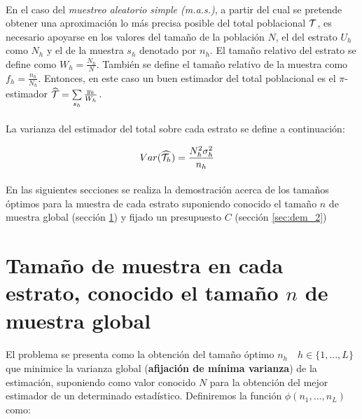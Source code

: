 \documentclass{article}
\begin{document}
    \paragraph{}
    En el caso del \emph{muestreo aleatorio simple (m.a.s.)}, a partir del cual se pretende obtener una aproximación lo más precisa posible del total poblacional $\mathcal{T}$, es necesario apoyarse en los valores del tamaño de la población $N$, el del estrato $U_h$ como $N_h$ y el de la muestra $s_h$ denotado por $n_h$. El tamaño relativo del estrato se define como $W_h = \frac{N_h}{N}$. También se define el tamaño relativo de la muestra como $f_h = \frac{n_h}{N_h}$. Entonces, en este caso un buen estimador del total poblacional es el $\pi$-estimador $\widehat{\mathcal{T}} = \sum\limits_{s_h} \frac{y_k}{W_h}$.

    \paragraph{}
    La varianza del estimador del total sobre cada estrato se define a continuación:

    \begin{align}
      Var(\widehat{\mathcal{T}_h}) &= \frac{N_h^2 \sigma_h^{2}}{n_h}
    \end{align}

    \paragraph{}
    En las siguientes secciones se realiza la demostración acerca de los tamaños óptimos para la muestra de cada estrato suponiendo conocido el tamaño $n$ de muestra global (sección \ref{sec:dem_1}) y fijado un presupuesto $C$ (sección \ref{sec:dem_2})


    \section{Tamaño de muestra en cada estrato, conocido el tamaño $n$ de muestra global}
    \label{sec:dem_1}

      \paragraph{}
      El problema se presenta como la obtención del tamaño óptimo $n_h \quad h \in \{1,..., L\}$ que minimice la varianza global (\textbf{afijación de mínima varianza}) de la estimación, suponiendo como valor conocido $N$ para la obtención del mejor estimador de un determinado estadístico. Definiremos la función $\phi(n_1, ..., n_L)$ como:
\end{document}
